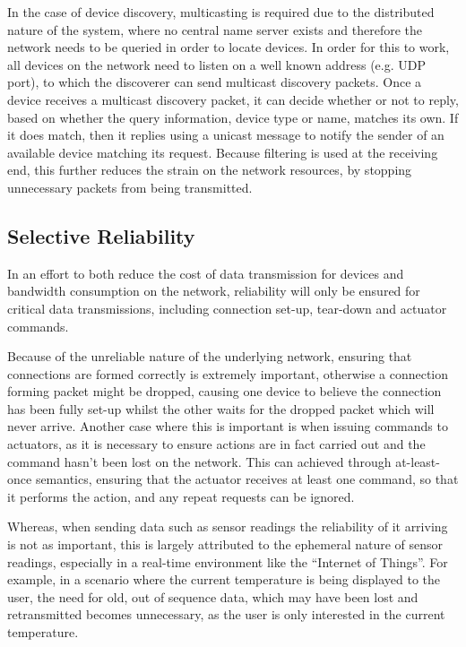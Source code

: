 In the case of device discovery, multicasting is required due to the distributed nature of the system, where no central name server exists and therefore the network needs to be queried in order to locate devices. In order for this to work, all devices on the network need to listen on a well known address (e.g. UDP port), to which the discoverer can send multicast discovery packets.
Once a device receives a multicast discovery packet, it can decide whether or not to reply, based on whether the query information, device type or name, matches its own. If it does match, then it replies using a unicast message to notify the sender of an available device matching its request. Because filtering is used at the receiving end, this further reduces the strain on the network resources, by stopping unnecessary packets from being transmitted.   

\subsection{Selective Reliability} %
\label{sub:selective_reliability}
In an effort to both reduce the cost of data transmission for devices and bandwidth consumption on the network, reliability will only be ensured for critical data transmissions, including connection set-up, tear-down and actuator commands.

Because of the unreliable nature of the underlying network, ensuring that connections are formed correctly is extremely important, otherwise a connection forming packet might be dropped, causing one device to believe the connection has been fully set-up whilst the other waits for the dropped packet which will never arrive. 
Another case where this is important is when issuing commands to actuators, as it is necessary to ensure actions are in fact carried out and the command hasn't been lost on the network. This can achieved through at-least-once semantics, ensuring that the actuator receives at least one command, so that it performs the action, and any repeat requests can be ignored.

Whereas, when sending data such as sensor readings the reliability of it arriving is not as important, this is largely attributed to the ephemeral nature of sensor readings, especially in a real-time environment like the ``Internet of Things''. For example, in a scenario where the current temperature is being displayed to the user, the need for old, out of sequence data, which may have been lost and retransmitted becomes unnecessary, as the user is only interested in the current temperature.


